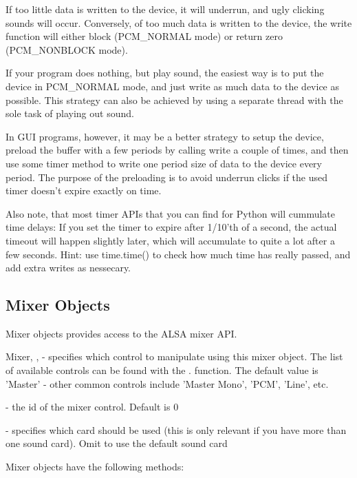 If too little data is written to the device, it will underrun, and
ugly clicking sounds will occur. Conversely, of too much data is
written to the device, the write function will either block
(PCM_NORMAL mode) or return zero (PCM_NONBLOCK mode).

If your program does nothing, but play sound, the easiest way is to
put the device in PCM_NORMAL mode, and just write as much data to the
device as possible. This strategy can also be achieved by using a
separate thread with the sole task of playing out sound.

In GUI programs, however, it may be a better strategy to setup the
device, preload the buffer with a few periods by calling write a
couple of times, and then use some timer method to write one period
size of data to the device every period. The purpose of the preloading
is to avoid underrun clicks if the used timer doesn't expire exactly
on time.

Also note, that most timer APIs that you can find for Python will
cummulate time delays: If you set the timer to expire after 1/10'th of
a second, the actual timeout will happen slightly later, which will
accumulate to quite a lot after a few seconds. Hint: use time.time()
to check how much time has really passed, and add extra writes as
nessecary.

\subsection{Mixer Objects}
\label{mixer-objects}

Mixer objects provides access to the ALSA mixer API.

\begin{classdesc}{Mixer}{, , 
    }
   - specifies which control to manipulate using this
  mixer object. The list of available controls can be found with the
  . function.  The default value is
  'Master' - other common controls include 'Master Mono', 'PCM',
  'Line', etc.

   - the id of the mixer control. Default is 0

   - specifies which card should be used (this is only
  relevant if you have more than one sound card). Omit to use the
  default sound card
\end{classdesc}

Mixer objects have the following methods:

